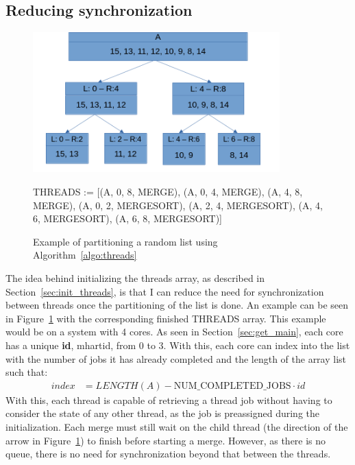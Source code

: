 \subsection{Reducing synchronization}
\begin{figure}
  \begin{center}
    \includegraphics[width=0.85\textwidth]{figures/mergesort.png}
  \end{center}
  THREADS := [(A, 0, 8, MERGE), (A, 0, 4, MERGE), (A, 4, 8, MERGE), (A, 0, 2,
  MERGESORT), (A, 2, 4, MERGESORT), (A, 4, 6, MERGESORT), (A, 6, 8, MERGESORT)]
  \caption{Example of partitioning a random list using
  Algorithm~\ref{algo:threads}}\label{fig:mergesort}
\end{figure}

The idea behind initializing the threads array, as described in
Section~\ref{sec:init_threads}, is that I can reduce the need for
synchronization between threads once the partitioning of the list is done. An
example can be seen in Figure~\ref{fig:mergesort} with the corresponding
finished THREADS array. This example would be on a system with 4 cores. As seen
in Section~\ref{sec:get_main}, each core has a unique \textbf{id}, mhartid, from 0 to 3.
With this, each core can index into the list with the number of jobs it has
already completed and the length of the array list such that:
\begin{align}
  index &= LENGTH(A) - \text{NUM\_COMPLETED\_JOBS}\cdot id
\end{align}
With this, each thread is capable of retrieving a thread job without having to
consider the state of any other thread, as the job is preassigned during the
initialization. Each merge must still wait on the child thread (the direction of
the arrow in Figure~\ref{fig:mergesort}) to finish before starting a merge.
However, as there is no queue, there is no need for synchronization beyond that
between the threads.


